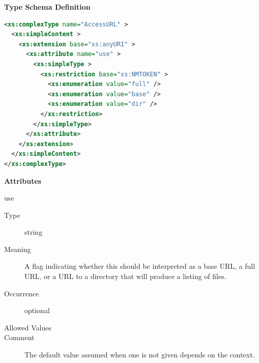 \documentclass[11pt,a4paper]{ivoa}
\begin{document}
\begin{generated}
\begingroup
      	\renewcommand*\descriptionlabel[1]{%
      	\hbox to 5.5em{\emph{#1}\hfil}}\vspace{1ex}\noindent\textbf{ Type Schema Definition}

\begin{lstlisting}[language=XML,basicstyle=\footnotesize]
<xs:complexType name="AccessURL" >
  <xs:simpleContent >
    <xs:extension base="xs:anyURI" >
      <xs:attribute name="use" >
        <xs:simpleType >
          <xs:restriction base="xs:NMTOKEN" >
            <xs:enumeration value="full" />
            <xs:enumeration value="base" />
            <xs:enumeration value="dir" />
          </xs:restriction>
        </xs:simpleType>
      </xs:attribute>
    </xs:extension>
  </xs:simpleContent>
</xs:complexType>
\end{lstlisting}

\vspace{0.5ex}\noindent\textbf{ Attributes}

\begingroup\small\begin{bigdescription}
\item[use]
\begin{description}
\item[Type] string
\item[Meaning] 
               A flag indicating whether this should be interpreted as a base
               URL, a full URL, or a URL to a directory that will produce a 
               listing of files.
             
\item[Occurrence] optional

\item[Allowed Values]\hfil
{}
\item[Comment] 
               The default value assumed when one is not given depends on the 
               context.  
             
\end{description}


\end{bigdescription}\endgroup

\endgroup
\end{generated}
\end{document}
